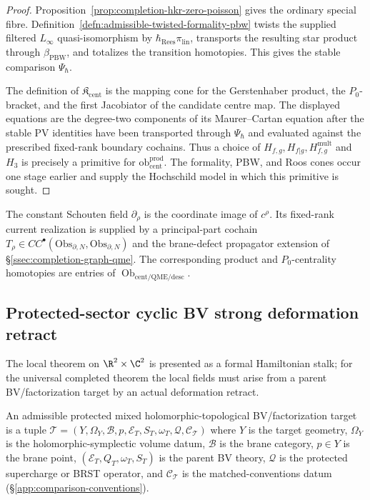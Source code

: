 \begin{proof}
Proposition~\ref{prop:completion-hkr-zero-poisson} gives the ordinary
special fibre.  Definition~\ref{defn:admissible-twisted-formality-pbw}
twists the supplied filtered \(L_\infty\) quasi-isomorphism by
\(\hbar_{\mathrm{Rees}}\pi_{\mathrm{lin}}\), transports the resulting
star product through \(\beta_{\mathrm{PBW}}\), and totalizes the
transition homotopies.  This gives the stable comparison
\(\Psi_\hbar\).

The definition of \(\mathfrak K_{\mathrm{cent}}\) is the mapping cone
for the Gerstenhaber product, the \(P_0\)-bracket, and the first
Jacobiator of the candidate centre map.  The displayed equations are
the degree-two components of its Maurer--Cartan equation after the
stable PV identities have been transported through
\(\Psi_\hbar\) and evaluated against the prescribed fixed-rank
boundary cochains.  Thus a choice of
\(H_{f,g},H_{f|g},H^{\mathrm{mult}}_{f,g}\)
and \(H_3\) is precisely a primitive for
\(\mathrm{ob}^{\mathrm{prod}}_{\mathrm{cent}}\).  The formality,
PBW, and Roos cones occur one stage earlier and supply the Hochschild
model in which this primitive is sought.
\end{proof}

\begin{rmk}
\label{rmk:completion-cotangent-centrality}
The constant Schouten field \(\partial_\rho\) is the coordinate image
of \(c^\rho\).  Its fixed-rank current realization is supplied by a
principal-part cochain
\(T_\rho\in
CC^\bullet(\mathrm{Obs}_{\partial,N},
           \mathrm{Obs}_{\partial,N})\)
and the brane-defect propagator extension of
\S\ref{ssec:completion-graph-qme}.  The corresponding product and
\(P_0\)-centrality homotopies are entries of
\(\operatorname{Ob}_{\mathrm{cent/QME/desc}}\).
\end{rmk}

\subsection{Protected-sector cyclic BV strong deformation retract}
\label{ssec:completion-protected-sector-sdr}

The local theorem on \(\R^2\times\C^2\) is presented as a formal
Hamiltonian stalk; for the universal completed theorem the local
fields must arise from a parent BV/factorization target by an actual
deformation retract.

\begin{defn}
\label{def:completion-admissible-protected-target}
An admissible protected mixed holomorphic-topological BV/factorization
target is a tuple
\(\mathcal T=(Y,\Omega_Y,\mathcal B,p,\mathcal E_T,S_T,\omega_T,
\mathcal Q,\mathcal C_{\mathcal T})\) where \(Y\) is the target
geometry, \(\Omega_Y\) is the holomorphic-symplectic volume datum,
\(\mathcal B\) is the brane category, \(p\in Y\) is the brane
point, \((\mathcal E_T,Q_T,\omega_T,S_T)\) is the parent BV
theory, \(\mathcal Q\) is the protected supercharge or BRST
operator, and \(\mathcal C_{\mathcal T}\) is the matched-conventions
datum (\S\ref{app:comparison-conventions}).
\end{defn}

